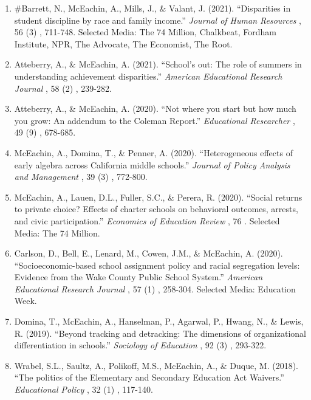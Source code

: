 \documentclass[11pt, letterpaper]{article}
\newcommand*{\revtotal}{0}
\newcommand*{\revarabic}[1]{\number\numexpr\revtotal + 1 - \value{#1}\relax}
\begin{document}
\begin{enumerate}[leftmargin=2em, label=\revarabic*.]
  \item \#Barrett, N., McEachin, A., Mills, J., \& Valant, J. (2021).
  ``Disparities in student discipline by race and family income.''
  \textit{Journal of Human Resources}%
, 56%
(3)%
, 711-748.
  Selected Media: The 74 Million, Chalkbeat, Fordham Institute, NPR, The Advocate, The Economist, The Root.

  \item Atteberry, A., \& McEachin, A. (2021).
  ``School's out: The role of summers in understanding achievement disparities.''
  \textit{American Educational Research Journal}%
, 58%
(2)%
, 239-282.

  \item Atteberry, A., \& McEachin, A. (2020).
  ``Not where you start but how much you grow: An addendum to the Coleman Report.''
  \textit{Educational Researcher}%
, 49%
(9)%
, 678-685.

  \item McEachin, A., Domina, T., \& Penner, A. (2020).
  ``Heterogeneous effects of early algebra across California middle schools.''
  \textit{Journal of Policy Analysis and Management}%
, 39%
(3)%
, 772-800.

  \item McEachin, A., Lauen, D.L., Fuller, S.C., \& Perera, R. (2020).
  ``Social returns to private choice? Effects of charter schools on behavioral outcomes, arrests, and civic participation.''
  \textit{Economics of Education Review}%
, 76%
%
.
  Selected Media: The 74 Million.

  \item Carlson, D., Bell, E., Lenard, M., Cowen, J.M., \& McEachin, A. (2020).
  ``Socioeconomic-based school assignment policy and racial segregation levels: Evidence from the Wake County Public School System.''
  \textit{American Educational Research Journal}%
, 57%
(1)%
, 258-304.
  Selected Media: Education Week.

  \item Domina, T., McEachin, A., Hanselman, P., Agarwal, P., Hwang, N., \& Lewis, R. (2019).
  ``Beyond tracking and detracking: The dimensions of organizational differentiation in schools.''
  \textit{Sociology of Education}%
, 92%
(3)%
, 293-322.

  \item Wrabel, S.L., Saultz, A., Polikoff, M.S., McEachin, A., \& Duque, M. (2018).
  ``The politics of the Elementary and Secondary Education Act Waivers.''
  \textit{Educational Policy}%
, 32%
(1)%
, 117-140.


\end{enumerate}
\end{document}
